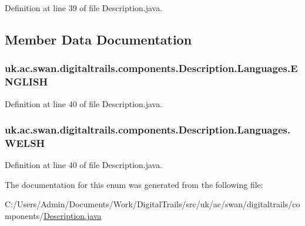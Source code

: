 Definition at line 39 of file Description.\+java.



\subsection{Member Data Documentation}
\hypertarget{enumuk_1_1ac_1_1swan_1_1digitaltrails_1_1components_1_1_description_1_1_languages_ae7a7797632b7148d9432d216e1ae8273}{
\subsubsection[{E\+N\+G\+L\+I\+S\+H}]{\setlength{\rightskip}{0pt plus 5cm}uk.\+ac.\+swan.\+digitaltrails.\+components.\+Description.\+Languages.\+E\+N\+G\+L\+I\+S\+H}}\label{enumuk_1_1ac_1_1swan_1_1digitaltrails_1_1components_1_1_description_1_1_languages_ae7a7797632b7148d9432d216e1ae8273}


Definition at line 40 of file Description.\+java.

\hypertarget{enumuk_1_1ac_1_1swan_1_1digitaltrails_1_1components_1_1_description_1_1_languages_a9025caaf5ee7dae0600bc60c953beea9}{
\subsubsection[{W\+E\+L\+S\+H}]{\setlength{\rightskip}{0pt plus 5cm}uk.\+ac.\+swan.\+digitaltrails.\+components.\+Description.\+Languages.\+W\+E\+L\+S\+H}}\label{enumuk_1_1ac_1_1swan_1_1digitaltrails_1_1components_1_1_description_1_1_languages_a9025caaf5ee7dae0600bc60c953beea9}


Definition at line 40 of file Description.\+java.



The documentation for this enum was generated from the following file\+:\begin{DoxyCompactItemize}
\item 
C\+:/\+Users/\+Admin/\+Documents/\+Work/\+Digital\+Trails/src/uk/ac/swan/digitaltrails/components/\hyperlink{_description_8java}{Description.\+java}\end{DoxyCompactItemize}
